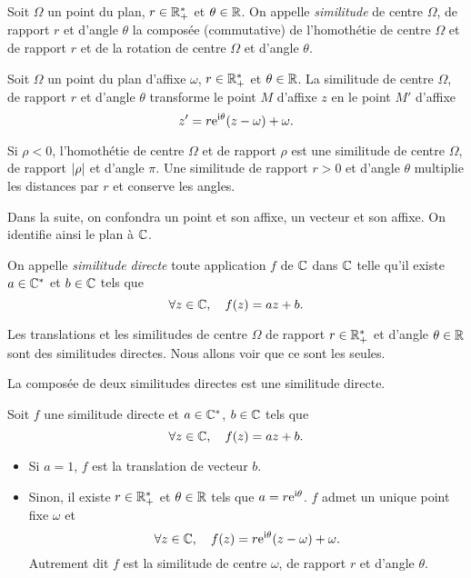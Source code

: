 \documentclass{magnolia}
\begin{document}
\begin{definition}[utile=-3]
Soit $\Omega$ un point du plan, $r\in\mathbb{R}_+^*$ et $\theta\in\mathbb{R}$. On appelle \emph{similitude} de centre $\Omega$, de rapport $r$ et d'angle $\theta$ la composée (commutative) de l'homothétie de centre $\Omega$ et de rapport $r$ et de la rotation de centre $\Omega$ et d'angle $\theta$.
\end{definition}

\begin{proposition}[utile=-3]
Soit $\Omega$ un point du plan d'affixe $\omega$, $r\in\mathbb{R}_+^*$ et $\theta\in\mathbb{R}$. La similitude de centre $\Omega$, de rapport $r$ et d'angle $\theta$ transforme le point $M$ d'affixe $z$ en le point $M'$ d'affixe
\[z'=r{\rm e}^{{\rm i}\theta}(z-\omega)+\omega.\]
\end{proposition}

\begin{remarques}
\remarque Si $\rho<0$, l'homothétie de centre $\Omega$ et de rapport $\rho$ est
  une similitude de centre $\Omega$, de rapport $\left|\rho\right|$ et d'angle $\pi$.
\remarque Une similitude de rapport $r>0$ et d'angle $\theta$ multiplie les distances par
  $r$ et conserve les angles.
\end{remarques}

Dans la suite, on confondra un point et son affixe, un vecteur et son affixe. On identifie ainsi le plan à $\mathbb{C}$.

\begin{definition}
On appelle \emph{similitude directe} toute application $f$ de $\mathbb{C}$ dans $\mathbb{C}$ telle qu'il existe $a\in\mathbb{C}^*$ et $b\in\mathbb{C}$ tels que
\[\forall z\in\mathbb{C},\quad f(z)=az+b.\]
\end{definition}

\begin{remarqueUnique}
\remarque Les translations et les similitudes de centre $\Omega$ de rapport $r\in\mathbb{R}_+^*$ et d'angle $\theta\in\mathbb{R}$ sont des similitudes directes. Nous allons voir que ce sont les seules.
\end{remarqueUnique}

\begin{proposition}
La composée de deux similitudes directes est une similitude directe.
\end{proposition}

\begin{proposition}
Soit $f$ une similitude directe et $a\in\mathbb{C}^*$, $b\in\mathbb{C}$ tels que
\[\forall z\in\mathbb{C},\quad f(z)=az+b.\]
\begin{itemize}
\item Si $a=1$, $f$ est la translation de vecteur $b$.
\item Sinon, il existe $r\in\mathbb{R}_+^*$ et $\theta\in\mathbb{R}$ tels que $a=r{\rm e}^{{\rm i}\theta}$. $f$ admet un unique point fixe $\omega$ et
\[\forall z\in\mathbb{C},\quad f(z)=r{\rm e}^{{\rm i}\theta}(z-\omega)+\omega.\]
Autrement dit $f$ est la similitude de centre $\omega$, de rapport $r$ et d'angle $\theta$.
\end{itemize}
\end{proposition}
\end{document}
